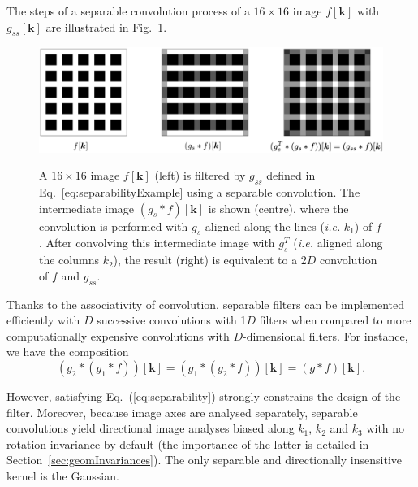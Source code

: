 \documentclass[fleqn,a4paper,oneside,openany]{book}
\begin{document}
The steps of a separable convolution process of a $16\times 16$ image $f[\boldsymbol{k}]$ with $g_{ss}[\boldsymbol{k}]$ are illustrated in Fig.~\ref{fig:separableConv}.
%
\begin{figure}
\centering
\includegraphics[trim = 0 0 0 0, clip, width=\linewidth]{separableConv.png}\\
\caption{A $16\times 16$ image $f[\boldsymbol{k}]$ (left) is filtered by $g_{ss}$ defined in Eq.~\eqref{eq:separabilityExample} using a separable convolution.
The intermediate image $(g_{s}\ast f)[\boldsymbol{k}]$ is shown (centre), where the convolution is performed with $g_s$ aligned along the lines (\textit{i.e.} $k_1$) of $f$.
After convolving this intermediate image with $g_{s}^T$ (\textit{i.e.} aligned along the columns $k_2$), the result (right) is equivalent to a 2$D$ convolution of $f$ and $g_{ss}$.}
  \label{fig:separableConv}
\end{figure}
%
%
Thanks to the associativity of convolution, separable filters can be implemented efficiently with $D$ successive convolutions with 1$D$ filters when compared to more computationally expensive convolutions with  $D$-dimensional filters.
For instance, we have the composition
\begin{equation}\label{eq:separability2Dexample}
(g_2\ast(g_1\ast f))[\boldsymbol{k}]=
(g_1\ast(g_2\ast f))[\boldsymbol{k}]=
(g\ast f)[\boldsymbol{k}].
\end{equation}

However, satisfying Eq.~(\ref{eq:separability}) strongly constrains the design of the filter. Moreover, because image axes are analysed separately, separable convolutions yield directional image analyses biased along $k_1$, $k_2$ and $k_3$ with no rotation invariance by default (the importance of the latter is detailed in Section~\ref{sec:geomInvariances}). The only separable and directionally insensitive kernel is the Gaussian.
\end{document}
